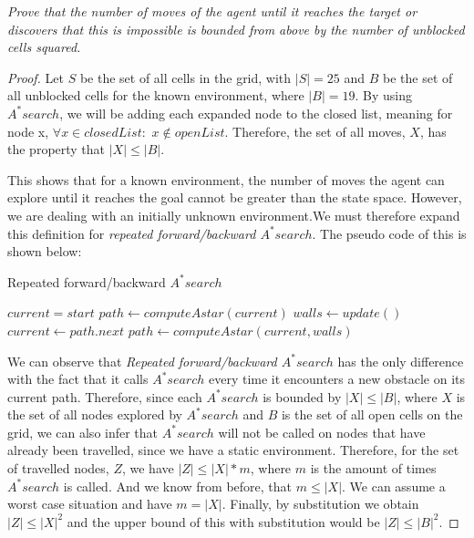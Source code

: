 \begin{qoute}
\emph{Prove that the number of moves of the agent until it reaches the target or discovers that this is impossible is bounded from above by the number of unblocked cells squared.}
\end{qoute}
\begin{proof}
Let $S$ be the set of all cells in the grid, with $|S| = 25$ and $B$ be the set of all unblocked cells for the known environment, where $|B| = 19$. By using $A^* search$, we will be adding each expanded node to the closed list, meaning for node x, $\forall x \in closedList:$ $x \notin openList$. Therefore, the set of all moves, $X$, has the property that $|X| \leq |B|$.


This shows that for a known environment, the number of moves the agent can explore until it reaches the goal cannot be greater than the state space. However, we are dealing with an initially unknown environment.We must therefore expand this definition for \emph{repeated forward/backward $A^* search$}. The pseudo code of this is shown below:

\begin{algorithm}
    \caption{Repeated forward/backward $A^* search$}
    \begin{algorithmic}
    
    \STATE $current = start$
    \STATE $path \leftarrow computeAstar(current)$
    \STATE $walls \leftarrow update()$
        \STATE $current \leftarrow path.next$
    \ELSE
        \STATE $path \leftarrow computeAstar(current, walls)$
        \ENDIF
    \ENDIF
    \ENDWHILE
    \end{algorithmic}
\end{algorithm}

We can observe that \emph{Repeated forward/backward $A^* search$} has the only difference with the fact that it calls $A^* search$ every time it encounters a new obstacle on its current path. Therefore, since each $A^* search$ is bounded by $|X| \leq |B|$, where $X$ is the set of all nodes explored by $A^* search$ and $B$ is the set of all open cells on the grid, we can also infer that $A^* search$ will not be called on nodes that have already been travelled, since we have a static environment. Therefore, for the set of travelled nodes, $Z$, we have $|Z| \leq |X|*m$, where $m$ is the amount of times $A^* search$ is called. And we know from before, that $m \leq |X|$. We can assume a worst case situation and have $m = |X|$. Finally, by substitution we obtain $|Z| \leq |X|^2$ and the upper bound of this with substitution would be $|Z| \leq |B|^2$.

\end{proof}